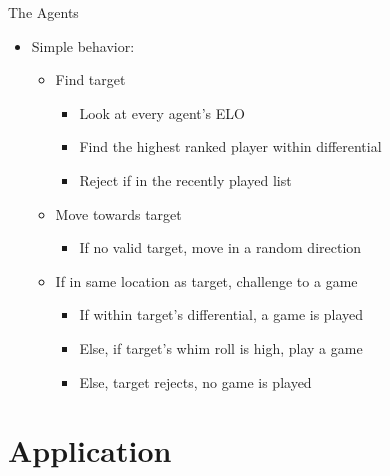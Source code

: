 \documentclass[12pt]{beamer}
\begin{document}
\begin{frame}{The Agents}
  \begin{itemize}
    \item Simple behavior:
    \begin{itemize}
      \item Find target
      \begin{itemize}
        \item Look at every agent's ELO
        \item Find the highest ranked player within differential
        \item Reject if in the recently played list
      \end{itemize}
      \item Move towards target
      \begin{itemize}
        \item If no valid target, move in a random direction
      \end{itemize}
      \item If in same location as target, challenge to a game
      \begin{itemize}
        \item If within target's differential, a game is played
        \item Else, if target's whim roll is high, play a game
        \item Else, target rejects, no game is played
      \end{itemize}
    \end{itemize}
  \end{itemize}
\end{frame}

\section{Application}
\end{document}
